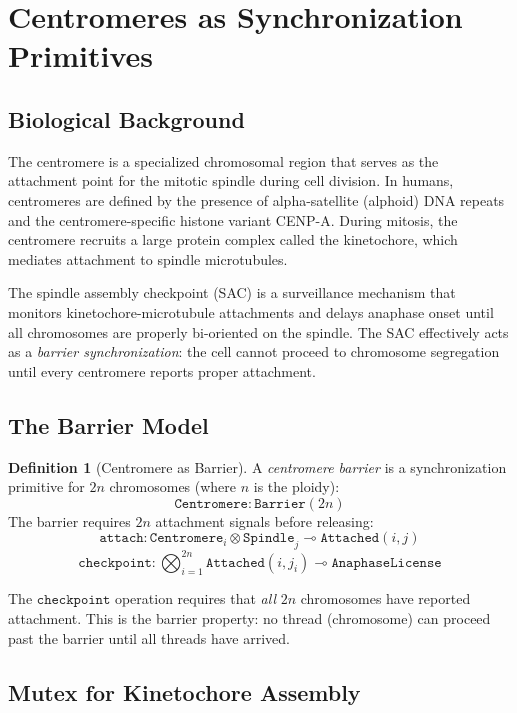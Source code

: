 \documentclass[12pt,a4paper]{article}
\theoremstyle{plain}
\theoremstyle{definition}
\newtheorem{definition}[theorem]{Definition}
\begin{document}
\section{Centromeres as Synchronization Primitives}\label{sec:centromeres}

\subsection{Biological Background}

The centromere is a specialized chromosomal region that serves as the attachment point for the mitotic spindle during cell division. In humans, centromeres are defined by the presence of alpha-satellite (alphoid) DNA repeats and the centromere-specific histone variant CENP-A. During mitosis, the centromere recruits a large protein complex called the kinetochore, which mediates attachment to spindle microtubules.

The spindle assembly checkpoint (SAC) is a surveillance mechanism that monitors kinetochore-microtubule attachments and delays anaphase onset until all chromosomes are properly bi-oriented on the spindle. The SAC effectively acts as a \emph{barrier synchronization}: the cell cannot proceed to chromosome segregation until every centromere reports proper attachment.

\subsection{The Barrier Model}

\begin{definition}[Centromere as Barrier]\label{def:centromere-barrier}
A \emph{centromere barrier} is a synchronization primitive for $2n$ chromosomes (where $n$ is the ploidy):
\[
  \texttt{Centromere} : \texttt{Barrier}(2n)
\]
The barrier requires $2n$ attachment signals before releasing:
\[
  \texttt{attach} : \texttt{Centromere}_i \otimes \texttt{Spindle}_j \multimap \texttt{Attached}(i, j)
\]
\[
  \texttt{checkpoint} : \bigotimes_{i=1}^{2n} \texttt{Attached}(i, j_i) \multimap \texttt{AnaphaseLicense}
\]
\end{definition}

The $\texttt{checkpoint}$ operation requires that \emph{all} $2n$ chromosomes have reported attachment. This is the barrier property: no thread (chromosome) can proceed past the barrier until all threads have arrived.

\subsection{Mutex for Kinetochore Assembly}
\end{document}
